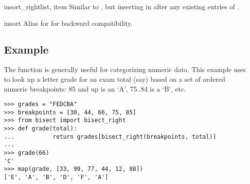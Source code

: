\begin{funcdesc}{insort_right}{list, item}
  Similar to , but inserting  in
   after any existing entries of .
\end{funcdesc}

\begin{funcdesc}{insort}{\unspecified}
  Alias for  for backward compatibility.
\end{funcdesc}


\subsection{Example}

The  function is generally useful for categorizing
numeric data.  This example uses  to look up a
letter grade for an exam total (say) based on a set of ordered numeric
breakpoints: 85 and up is an `A', 75..84 is a `B', etc.

\begin{verbatim}
>>> grades = "FEDCBA"
>>> breakpoints = [30, 44, 66, 75, 85]
>>> from bisect import bisect_right
>>> def grade(total):
...           return grades[bisect_right(breakpoints, total)]
...
>>> grade(66)
'C'
>>> map(grade, [33, 99, 77, 44, 12, 88])
['E', 'A', 'B', 'D', 'F', 'A']
\end{verbatim}

